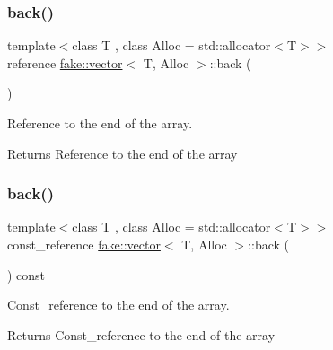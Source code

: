 \subsubsection{\texorpdfstring{back()}{back()}\hspace{0.1cm}{\footnotesize\ttfamily [1/2]}}
{\footnotesize\ttfamily template$<$class T , class Alloc  = std\+::allocator$<$\+T$>$$>$ \\
reference \mbox{\hyperlink{classfake_1_1vector}{fake\+::vector}}$<$ T, Alloc $>$\+::back (\begin{DoxyParamCaption}{ }\end{DoxyParamCaption})\hspace{0.3cm}{\ttfamily [inline]}}



Reference to the end of the array. 

\begin{DoxyReturn}{Returns}
Reference to the end of the array 
\end{DoxyReturn}
\mbox{\label{classfake_1_1vector_a819b07f7862e65796d7457a6964f2ea4}} 
\subsubsection{\texorpdfstring{back()}{back()}\hspace{0.1cm}{\footnotesize\ttfamily [2/2]}}
{\footnotesize\ttfamily template$<$class T , class Alloc  = std\+::allocator$<$\+T$>$$>$ \\
const\+\_\+reference \mbox{\hyperlink{classfake_1_1vector}{fake\+::vector}}$<$ T, Alloc $>$\+::back (\begin{DoxyParamCaption}{ }\end{DoxyParamCaption}) const\hspace{0.3cm}{\ttfamily [inline]}}



Const\+\_\+reference to the end of the array. 

\begin{DoxyReturn}{Returns}
Const\+\_\+reference to the end of the array 
\end{DoxyReturn}
\mbox{\label{classfake_1_1vector_aaf161eda743ae8c669aa5be71f3ff8a7}} 
